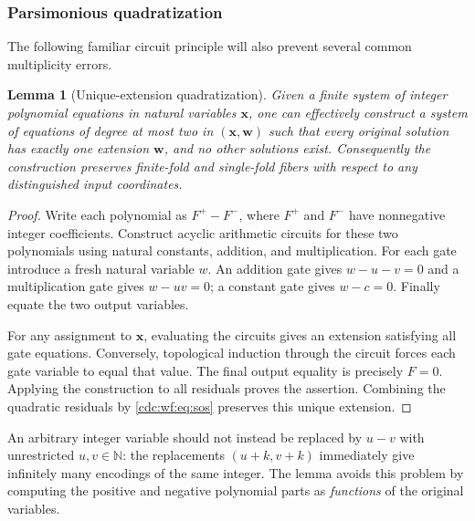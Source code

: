 \documentclass[11pt,a4paper]{article}
\newtheorem{lemma}[lemma]{Lemma}
\theoremstyle{definition}
\theoremstyle{remark}
\newcommand{\N}{\mathbb N}
\begin{document}
\subsubsection{Parsimonious quadratization}
The following familiar circuit principle will also prevent several common multiplicity errors.
\begin{lemma}[Unique-extension quadratization]\label{cdc:wf:lem:quadratization}
Given a finite system of integer polynomial equations in natural variables $\mathbf x$, one can effectively construct a system of equations of degree at most two in $(\mathbf x,\mathbf w)$ such that every original solution has exactly one extension $\mathbf w$, and no other solutions exist. Consequently the construction preserves finite-fold and single-fold fibers with respect to any distinguished input coordinates.
\end{lemma}
\begin{proof}
Write each polynomial as $F^+-F^-$, where $F^+$ and $F^-$ have nonnegative integer coefficients. Construct acyclic arithmetic circuits for these two polynomials using natural constants, addition, and multiplication. For each gate introduce a fresh natural variable $w$. An addition gate gives $w-u-v=0$ and a multiplication gate gives $w-uv=0$; a constant gate gives $w-c=0$. Finally equate the two output variables.

For any assignment to $\mathbf x$, evaluating the circuits gives an extension satisfying all gate equations. Conversely, topological induction through the circuit forces each gate variable to equal that value. The final output equality is precisely $F=0$. Applying the construction to all residuals proves the assertion. Combining the quadratic residuals by \eqref{cdc:wf:eq:sos} preserves this unique extension.
\end{proof}

An arbitrary integer variable should not instead be replaced by $u-v$ with unrestricted $u,v\in\N$: the replacements $(u+k,v+k)$ immediately give infinitely many encodings of the same integer. The lemma avoids this problem by computing the positive and negative polynomial parts as \emph{functions} of the original variables.
\end{document}
